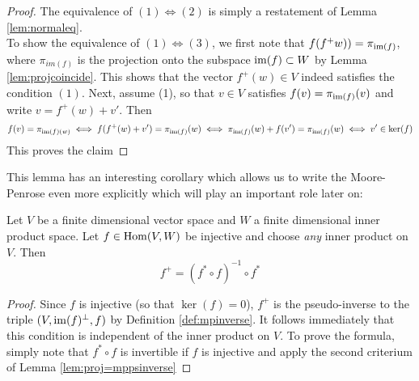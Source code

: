 \begin{proof}
	The equivalence of $(1)\iff (2)$ is simply a restatement of Lemma \ref{lem:normaleq}.\\
	To show the equivalence of $(1)\iff (3)$, we first note that $f(f^+w))=\pi_{\operatorname{im}(f)}$, where $\pi_{im(f)}$ is the projection onto the subspace $\operatorname{im}(f)\subset W$ by Lemma \ref{lem:projcoincide}. This shows that the vector $f^+(w) \in V$ indeed satisfies the condition $(1)$. Next, assume (1), so that $v \in V$ satisfies $f(v)=\pi_{\operatorname{im}(f)}(v)$ and write $v= f^+(w)+v'$. Then\[
	f(v)=\pi_{\operatorname{im}(f)(w)}\iff f(f^+(w)+v')=\pi_{\operatorname{im}(f)}(w)\iff \pi_{\operatorname{im}(f)}(w)+f(v')=\pi_{\operatorname{im}(f)}(w)\iff v'\in \ker(f)
	\]
	This proves the claim
\end{proof}

This lemma has an interesting corollary which allows us to write the Moore-Penrose even more explicitly which will play an important role later on:

\begin{corollary}\label{cor:psinverse-injective}
Let $V$ be a finite dimensional vector space and $W$ a finite dimensional inner product space. Let $f \in \operatorname{Hom}(V,W)$ be injective and choose \emph{any} inner product on $V$. Then
\[
f^+ = (f^*\circ f)^{-1}\circ f^*
\] 
\end{corollary}

\begin{proof}
	Since $f$ is injective (so that $\ker(f)=0$), $f^+$ is the pseudo-inverse to the triple $(V,\operatorname{im}(f)^{\perp},f)$ by Definition \ref{def:mpinverse}. It follows immediately that this condition is independent of the inner product on $V$. To prove the formula, simply note that $f^*\circ f$ is invertible if $f$ is injective and apply the second criterium of Lemma \ref{lem:proj=mppsinverse}
\end{proof}